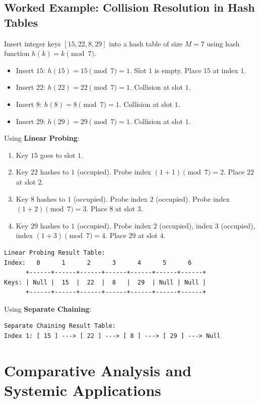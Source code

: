 \documentclass[12pt]{report}
\begin{document}
\subsection{Worked Example: Collision Resolution in Hash Tables}

Insert integer keys $[15, 22, 8, 29]$ into a hash table of size $M = 7$ using hash function $h(k) = k \pmod 7$.

\begin{itemize}
    \item Insert $15$: $h(15) = 15 \pmod 7 = 1$. Slot $1$ is empty. Place $15$ at index $1$.
    \item Insert $22$: $h(22) = 22 \pmod 7 = 1$. Collision at slot $1$.
    \item Insert $8$: $h(8) = 8 \pmod 7 = 1$. Collision at slot $1$.
    \item Insert $29$: $h(29) = 29 \pmod 7 = 1$. Collision at slot $1$.
\end{itemize}

Using \textbf{Linear Probing}:
\begin{enumerate}
    \item Key $15$ goes to slot $1$.
    \item Key $22$ hashes to $1$ (occupied). Probe index $(1+1) \pmod 7 = 2$. Place $22$ at slot $2$.
    \item Key $8$ hashes to $1$ (occupied). Probe index $2$ (occupied). Probe index $(1+2) \pmod 7 = 3$. Place $8$ at slot $3$.
    \item Key $29$ hashes to $1$ (occupied). Probe index $2$ (occupied), index $3$ (occupied), index $(1+3) \pmod 7 = 4$. Place $29$ at slot $4$.
\end{enumerate}

\begin{verbatim}
Linear Probing Result Table:
Index:   0      1      2      3      4      5      6
      +------+------+------+------+------+------+------+
Keys: | Null |  15  |  22  |  8   |  29  | Null | Null |
      +------+------+------+------+------+------+------+
\end{verbatim}

Using \textbf{Separate Chaining}:
\begin{verbatim}
Separate Chaining Result Table:
Index 1: [ 15 ] ---> [ 22 ] ---> [ 8 ] ---> [ 29 ] ---> Null
\end{verbatim}

\section{Comparative Analysis and Systemic Applications}
\end{document}
